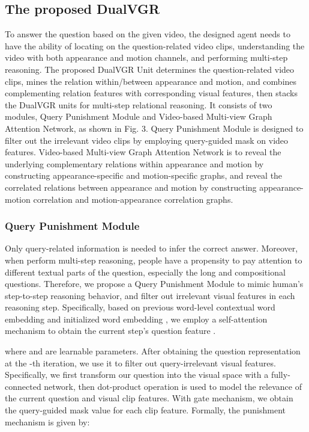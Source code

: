 \documentclass[journal]{IEEEtran}
\begin{document}
\subsection{The proposed DualVGR} 
To answer the question based on the given video, the designed agent needs to have the ability of locating on the question-related video clips, understanding the video with both appearance and motion channels, and performing multi-step reasoning. The proposed DualVGR Unit determines the question-related video clips, mines the relation within/between appearance and motion, and combines complementing relation features with corresponding visual features, then stacks the DualVGR units for multi-step relational reasoning. It consists of two modules, Query Punishment Module and Video-based Multi-view Graph Attention Network, as shown in Fig. 3. Query Punishment Module is designed to filter out the irrelevant video clips by employing query-guided mask on video features. Video-based Multi-view Graph Attention Network is to reveal the underlying complementary relations within appearance and motion by constructing appearance-specific and motion-specific graphs, and reveal the correlated relations between appearance and motion by constructing appearance-motion correlation and motion-appearance correlation graphs.
\subsubsection{Query Punishment Module}
Only query-related information is needed to infer the correct answer. Moreover, when perform multi-step reasoning, people have a propensity to pay attention to different textual parts of the question, especially the long and compositional questions. Therefore, we propose a Query Punishment Module to mimic human's step-to-step reasoning behavior, and filter out irrelevant visual features in each reasoning step. Specifically, based on previous word-level contextual word embedding  and initialized word embedding , we employ a self-attention mechanism to obtain the current step's question feature .

\allowdisplaybreaks[4]

where  and  are learnable parameters. 
After obtaining the question representation  at the -th iteration, we use it to filter out query-irrelevant visual features. Specifically, we first transform our question into the visual space with a fully-connected network, then dot-product operation is used to model the relevance of the current question and visual clip features. With gate mechanism, we obtain the query-guided mask value for each clip feature. Formally, the punishment mechanism is given by:
\end{document}

